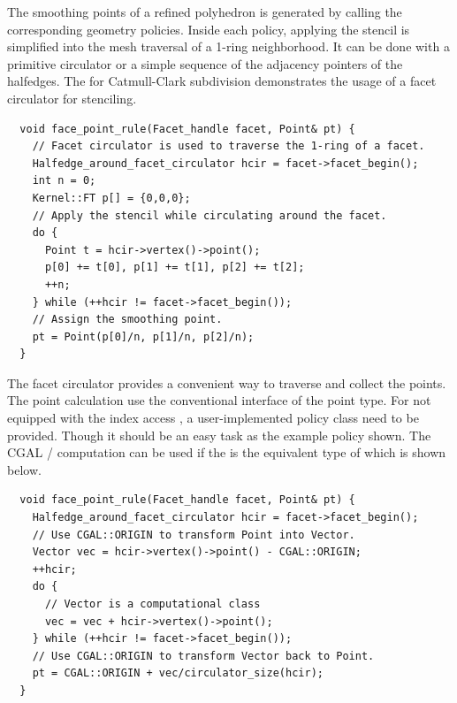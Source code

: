 The smoothing points of a refined polyhedron is generated 
by calling the corresponding geometry policies.  
Inside each policy, applying the stencil is simplified 
into the mesh traversal of a 
1-ring neighborhood. It can be done with a primitive 
circulator or a simple sequence of the adjacency pointers 
of the halfedges. The  for 
Catmull-Clark subdivision demonstrates the usage 
of a facet circulator for stenciling. 
\begin{lstlisting}
  void face_point_rule(Facet_handle facet, Point& pt) {
    // Facet circulator is used to traverse the 1-ring of a facet.
    Halfedge_around_facet_circulator hcir = facet->facet_begin();
    int n = 0;
    Kernel::FT p[] = {0,0,0};
    // Apply the stencil while circulating around the facet. 
    do {
      Point t = hcir->vertex()->point();
      p[0] += t[0], p[1] += t[1], p[2] += t[2]; 
      ++n;
    } while (++hcir != facet->facet_begin());
    // Assign the smoothing point.
    pt = Point(p[0]/n, p[1]/n, p[2]/n);
  }
\end{lstlisting}
The facet circulator provides a convenient way to
traverse and collect the points. The point calculation use
the conventional interface \CodeFmt{[i]} of the point type. 
For  not equipped with the index access 
\CodeFmt{[i]}, a user-implemented policy class need to be 
provided. Though it should be an easy task as the example policy
shown. The CGAL /
computation can be used if the  is the equivalent
type of  which is shown below. 
\begin{lstlisting}
  void face_point_rule(Facet_handle facet, Point& pt) {
    Halfedge_around_facet_circulator hcir = facet->facet_begin();
    // Use CGAL::ORIGIN to transform Point into Vector.
    Vector vec = hcir->vertex()->point() - CGAL::ORIGIN;
    ++hcir;
    do {
      // Vector is a computational class
      vec = vec + hcir->vertex()->point();
    } while (++hcir != facet->facet_begin());
    // Use CGAL::ORIGIN to transform Vector back to Point.
    pt = CGAL::ORIGIN + vec/circulator_size(hcir);
  }
\end{lstlisting}

